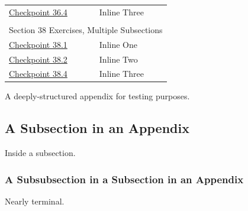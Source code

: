 \documentclass[pdflatex]{sn-jnl}
\theoremstyle{thmstyleone}%
\theoremstyle{thmstyletwo}%
\theoremstyle{thmstylethree}%
\numberwithin{equation}{section}
\begin{document}
\begin{appendices}
\begin{longtable}[l]{ll}
\hyperref[section-exercises-single-9]{Checkpoint 36.4}& Inline Three\\
\multicolumn{2}{l}{\null}\\[1.5ex] \multicolumn{2}{l}{\large Section 38 Exercises, Multiple Subsections}\\[0.5ex]
\hyperref[section-exercises-multiple-3-2]{Checkpoint 38.1}& Inline One\\
\hyperref[section-exercises-multiple-3-4]{Checkpoint 38.2}& Inline Two\\
\hyperref[exercise-duplicate-inline]{Checkpoint 38.4}& Inline Three\\
\end{longtable}
%
%
\typeout{************************************************}
\typeout{************************************************}
%
\label{appendix-structured}%
A deeply-structured appendix for testing purposes.%
%
%
\typeout{************************************************}
\typeout{************************************************}
%
\subsection{A Subsection in an Appendix}\label{appendix-structured-3}%
Inside a subsection.%
%
%
\typeout{************************************************}
\typeout{************************************************}
%
\subsubsection{A Subsubsection in a Subsection in an Appendix}\label{appendix-structured-3-3}%
Nearly terminal.%

\end{appendices}
\end{document}
